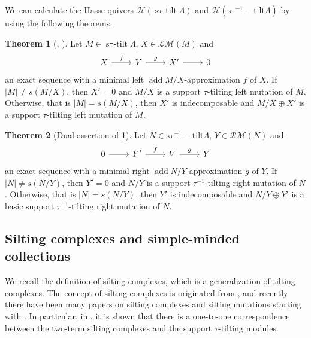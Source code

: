 \documentclass[pdftex,a4paper]{article}
\numberwithin{equation}{subsection}
\theoremstyle{definition}
\newtheorem{theorem}{Theorem}[section]
\newcommand{\add}{\operatorname{\mathrm{add}}}
\newcommand{\stautilt}{\operatorname{\mathrm{s\tau-tilt}}}
\newcommand{\stauitilt}{\operatorname{\mathrm{s\tau^{-1}-tilt}}}
\begin{document}
We can calculate the Hasse quivers \(\mathcal{H}(\stautilt \Lambda)\) and \(\mathcal{H}(\stauitilt \Lambda)\) by using
the following theorems.
\begin{theorem}[{\cite[Theorem 2.30]{MR3187626}, \cite[Theorem 1.2]{doi:10.1080/00927872.2016.1233239}}]\label{calclation method}
	Let \(M\in \stautilt \Lambda \), \(X \in \mathcal{LM}(M)\) and
	\begin{equation}
		\begin{tikzcd}
			X \ar[r,"f"]&V\ar[r,"g"]&X'\ar[r]&0
		\end{tikzcd}
	\end{equation}
	an exact sequence with a minimal left \(\add M/X\)-approximation \(f\) of \(X\).
	If \(|M|\neq s(M/X)\), then \(X'= 0\) and \(M/X\) is a support \(\tau\)-tilting left mutation of \(M\).
	Otherwise, that is \(|M|=s(M/X)\), then \(X'\) is indecomposable and \(M/X\oplus X'\) is a support \(\tau\)-tilting left mutation of \(M\).
\end{theorem}

\begin{theorem}[{Dual assertion of \cref{calclation method}}]\label{d calclation method}
	Let \(N\in\stauitilt \Lambda\), \(Y \in \mathcal{RM}(N)\) and
	\begin{equation}
		\begin{tikzcd}
			0\ar[r]&Y' \ar[r,"f"]&V\ar[r,"g"]&Y
		\end{tikzcd}
	\end{equation}
	an exact sequence with a minimal right \(\add N/Y\)-approximation \(g\) of \(Y\).
	If \(|N|\neq s(N/Y)\), then \(Y'= 0\) and \(N/Y\) is a support \(\tau^{-1}\)-tilting right mutation of \(N\).
	Otherwise, that is \(|N|=s(N/Y)\), then \(Y'\) is indecomposable and \(N/Y\oplus Y'\) is a basic support \(\tau^{-1}\)-tilting right mutation of \(N\).
\end{theorem}

\subsection{Silting complexes and simple-minded collections}
We recall the definition of silting complexes, which is a generalization of tilting complexes. The concept of silting complexes is originated from \cite{keller1988aisles}, and recently there have been many papers on silting complexes and silting mutations starting with \cite{MR2927802}.
In particular, in \cite{MR3187626}, it is shown that there is a one-to-one correspondence between the two-term silting complexes and the support \(\tau\)-tilting modules.
\end{document}
